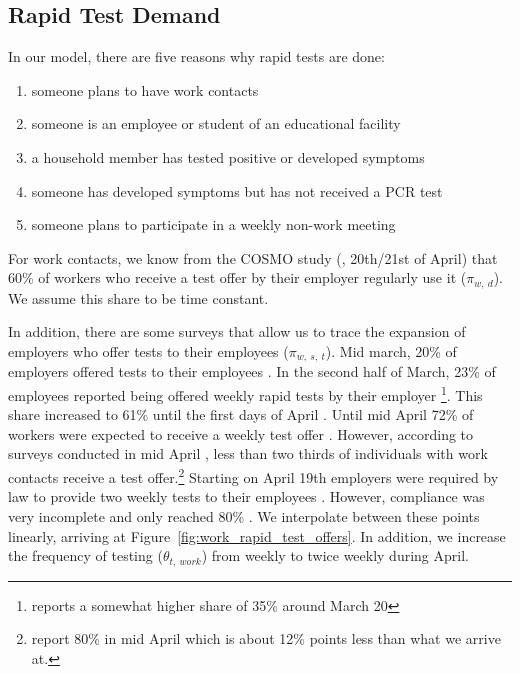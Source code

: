 \subsection{Rapid Test Demand}
\label{subsec:rapid_test_demand}

In our model, there are five reasons why rapid tests are done:

\begin{enumerate}
    \item someone plans to have work contacts
    \item someone is an employee or student of an educational facility
    \item a household member has tested positive or developed symptoms
    \item someone has developed symptoms but has not received a PCR test
    \item someone plans to participate in a weekly non-work meeting
\end{enumerate}


For work contacts, we know from the COSMO study (\cite{Betsch2021}, 20th/21st of April)
that 60\% of workers who receive a test offer by their employer regularly use it
($\pi_{w,\:d}$). We assume this share to be time constant.

In addition, there are some surveys that allow us to trace the expansion of employers
who offer tests to their employees ($\pi_{w,\:s,\:t}$). Mid march, 20\% of employers
offered tests to their employees \citep{DIHK2021}. In the second half of March, 23\% of
employees reported being offered weekly rapid tests by their employer
\citep{Ahlers2021}\footnote{\cite{IZA2021b} reports a somewhat higher share of 35\%
around March 20}. This share increased to 61\% until the first days of April
\citep{IZA2021c, IZA2021}. Until mid April 72\% of workers were expected to receive a
weekly test offer \citep{IZA2021c, IZA2021}. However, according to surveys conducted in
mid April \citep{Betsch2021}, less than two thirds of individuals with work contacts
receive a test offer.\footnote{\cite{IZA2021d} report 80\% in mid April which is about
12\% points less than what we arrive at.} Starting on April 19th employers were required
by law to provide two weekly tests to their employees \citep{Bundesanzeiger2021}.
However, compliance was very incomplete and only reached 80\% \citep{IAB2021b,
Ahlers2021b}. We interpolate between these points linearly, arriving at
Figure~\ref{fig:work_rapid_test_offers}. In addition, we increase the frequency of
testing ($\theta_{t,\:work}$) from weekly to twice weekly during April.

